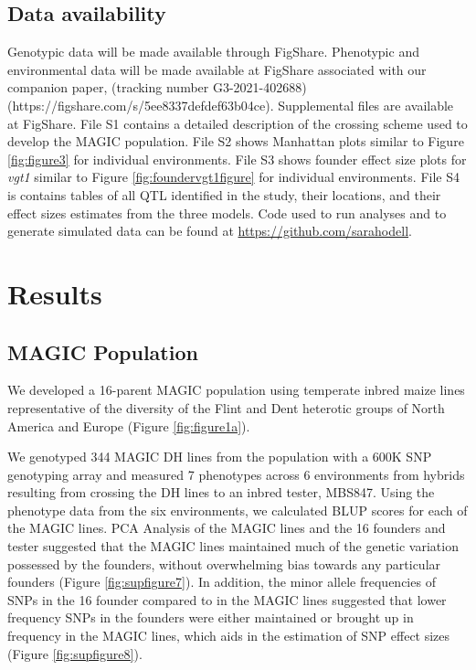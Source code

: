 \documentclass[9pt,twocolumn,twoside]{gsag3jnl}
\begin{document}
\subsection{Data availability}
Genotypic data will be made available through FigShare.
Phenotypic and environmental data will be made available at FigShare associated with our companion paper, \citep{Hudson_in_prep}(tracking number G3-2021-402688) (https://figshare.com/s/5ee8337defdef63b04ce). Supplemental files are available at FigShare. File S1 contains a detailed description of the crossing scheme used to develop the MAGIC population. File S2 shows Manhattan plots similar to Figure \ref{fig:figure3} for individual environments. File S3 shows founder effect size plots for \emph{vgt1} similar to Figure \ref{fig:foundervgt1figure} for individual environments. File S4 is contains tables of all QTL identified in the study, their locations, and their effect sizes estimates from the three models. Code used to run analyses and to generate simulated data can be found at \url{https://github.com/sarahodell}.

\section{Results}

\subsection{MAGIC Population}
We developed a 16-parent MAGIC population using temperate inbred maize lines representative of the diversity of the Flint and Dent heterotic groups of North America and Europe (Figure \ref{fig:figure1a}).

We genotyped 344 MAGIC DH lines from the population with a 600K SNP genotyping array and measured 7 phenotypes across 6 environments from hybrids resulting from crossing the DH lines to an inbred tester, MBS847.
Using the phenotype data from the six environments, we calculated BLUP scores for each of the MAGIC lines.
PCA Analysis of the MAGIC lines and the 16 founders and tester suggested that the MAGIC lines maintained much of the genetic variation possessed by the founders, without overwhelming bias towards any particular founders (Figure \ref{fig:supfigure7}).
In addition, the minor allele frequencies of SNPs in the 16 founder compared to in the MAGIC lines suggested that lower frequency SNPs in the founders were either maintained or brought up in frequency in the MAGIC lines, which aids in the estimation of SNP effect sizes (Figure \ref{fig:supfigure8}).
\end{document}

